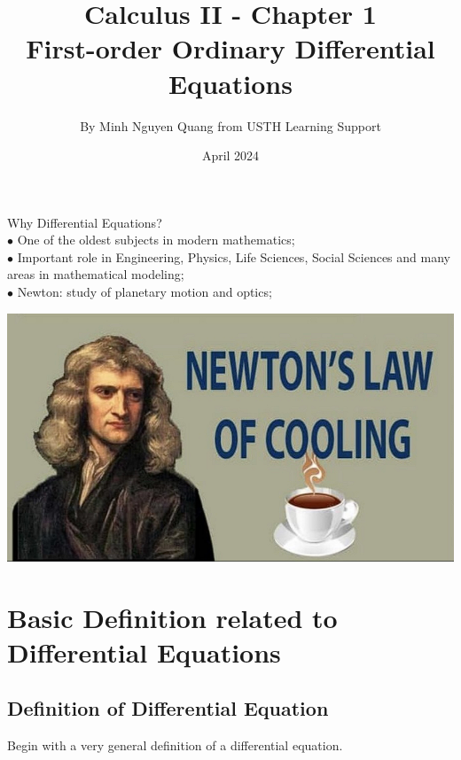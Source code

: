 \documentclass[12pt]{article}
\title{Calculus II - Chapter 1 \\   First-order Ordinary Differential Equations }
\author{By Minh Nguyen Quang from USTH Learning Support}
\date{April 2024}
\begin{document}
\maketitle
\tableofcontents
\newpage
Why Differential Equations?\\
$\bullet$ One of the oldest subjects in modern mathematics;
\\
$\bullet$ Important role in Engineering, Physics, Life Sciences, Social
Sciences and many areas in mathematical modeling; 
\\
$\bullet$ Newton: study of planetary motion and optics;\\
\begin{center}
    

\includegraphics[scale = 0.5]{Ảnh chụp màn hình 2024-06-10 021155.png}
\end{center}
\section{Basic Definition related to Differential Equations}
\subsection{Definition of Differential Equation }
Begin with a very general definition of a differential equation.
\end{document}
